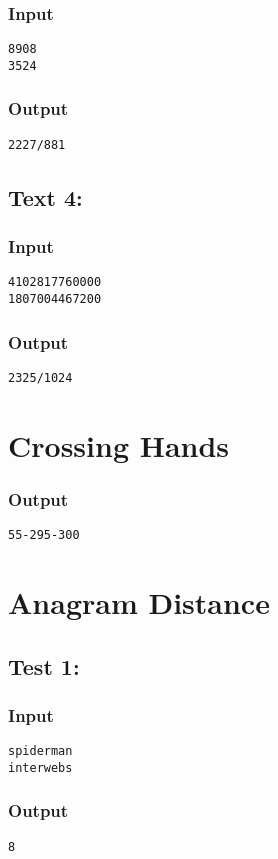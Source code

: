 \documentclass[twocolumn,9pt]{extarticle}
\begin{document}
\subsubsection*{Input}
\texttt{8908\\3524}

\subsubsection*{Output}
\texttt{2227/881}

\subsection*{Text 4:}
\subsubsection*{Input}
\texttt{4102817760000\\1807004467200}

\subsubsection*{Output}
\texttt{2325/1024}


\section{Crossing Hands}
\subsubsection*{Output}
\texttt{55-295-300}


\section{Anagram Distance}
\subsection*{Test 1:}
\subsubsection*{Input}
\texttt{spiderman\\
interwebs}

\subsubsection*{Output}
\texttt{8}
\end{document}
